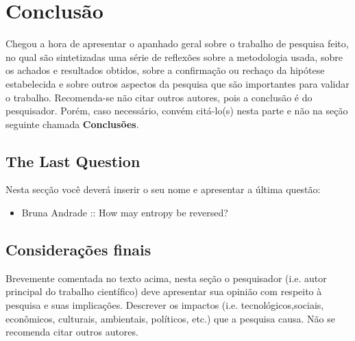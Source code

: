 \chapter{Conclusão}
\label{chap:conc}

Chegou a hora de apresentar o apanhado geral sobre o trabalho de
pesquisa feito, no qual s\~ao sintetizadas uma s\'erie de
reflex\~oes sobre a metodologia usada, sobre os achados e
resultados obtidos, sobre a confirma\c{c}\~ao ou recha\c{c}o da
hip\'otese estabelecida e sobre outros aspectos da pesquisa que
s\~ao importantes para validar o trabalho. Recomenda-se n\~ao
citar outros autores, pois a conclus\~ao \'e do pesquisador.
Por\'em, caso necess\'ario, conv\'em cit\'a-lo(s) nesta parte e
n\~ao na se\c{c}\~ao seguinte chamada \textbf{Conclus\~oes}.

\section{The Last Question}
Nesta secção você deverá inserir o seu nome e apresentar a última questão:

\begin{itemize}
    \item Bruna Andrade :: How may entropy be reversed?
\end{itemize}


\section{Considerações finais}
\label{sec:consid}

Brevemente comentada no texto acima, nesta se\c{c}\~ao o
pesquisador (i.e. autor principal do trabalho cient\'ifico) deve
apresentar sua opini\~ao com respeito \`a pesquisa e suas
implica\c{c}\~oes. Descrever os impactos (i.e.
tecnol\'ogicos,sociais, econ\^omicos, culturais, ambientais,
políticos, etc.) que a pesquisa causa. N\~ao se recomenda citar
outros autores.

